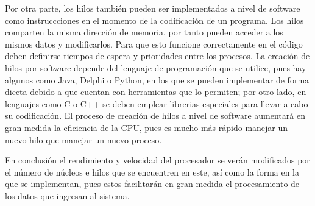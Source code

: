 \documentclass{article}
\begin{document}
\vspace{15pt}
Por otra parte, los hilos también pueden ser implementados a nivel de software como instruccciones en el momento de la codificación de un programa. Los hilos comparten la misma dirección de memoria, por tanto pueden acceder a los mismos datos y modificarlos. Para que esto funcione correctamente en el código deben definirse tiempos de espera y prioridades entre los procesos.
La creación de hilos por software depende del lenguaje de programación que se utilice, pues hay algunos como Java, Delphi o Python, en los que se pueden implementar de forma diecta debido a que cuentan con herramientas que lo permiten; por otro lado, en lenguajes como C o C++ se deben emplear librerias especiales para llevar a cabo su codificación. El proceso de creación de hilos a nivel de software aumentará en gran medida la eficiencia de la CPU, pues es mucho más rápido manejar un nuevo hilo que manejar un nuevo proceso.

\vspace{15pt}
En conclusión el rendimiento y velocidad del procesador se verán modificados por el número de núcleos e hilos que se encuentren en este, así como la forma en la que se implementan, pues estos facilitarán en gran medida el procesamiento de los datos que ingresan al sistema.

\newpage

\end{document}
